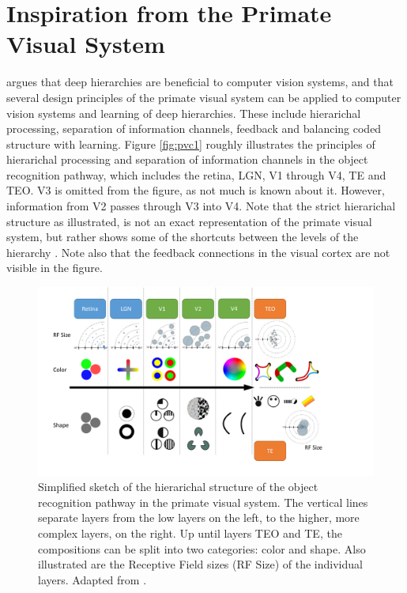 \section{Inspiration from the Primate Visual System}
\label{sec:pvc}
\cite{kruger2013deep} argues that deep hierarchies are beneficial to computer vision systems,
and that several design principles of the primate visual system can be applied
to computer vision systems and learning of deep hierarchies.
These include hierarichal processing, separation of information channels,
feedback and balancing coded structure with learning.
Figure \ref{fig:pvc1} roughly illustrates the principles of hierarichal processing and separation of information channels
in the object recognition pathway, which includes the retina, LGN, V1 through V4, TE and TEO.
V3 is omitted from the figure, as not much is known about it.
However, information from V2 passes through V3 into V4.
Note that the strict hierarichal structure as illustrated, is not an exact representation of the primate visual system,
but rather shows some of the shortcuts between the levels of the hierarchy \citep{kruger2013deep}.
Note also that the feedback connections in the visual cortex are not visible in the figure.

\begin{figure}[h!]
\centering
\includegraphics[width=1.1\textwidth]{graphics/pvc_figure1}
\caption[Object Recognition Pathway]{
Simplified sketch of the hierarichal structure of the object recognition pathway in the primate visual system.
The vertical lines separate layers from the low layers on the left, to the higher, more complex layers, on the right.
Up until layers TEO and TE, the compositions can be split into two categories: color and shape.
Also illustrated are the Receptive Field sizes (RF Size) of the individual layers.
Adapted from \cite{kruger2013deep}.
}
\label{fig:pcv1}
\end{figure}

